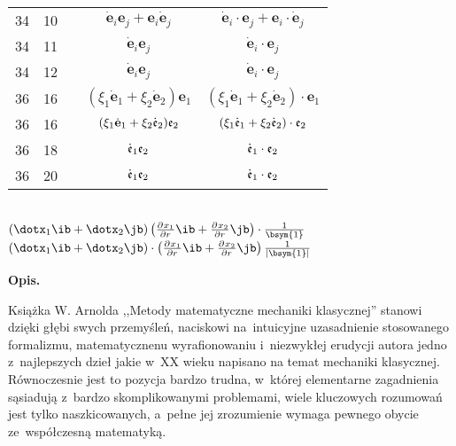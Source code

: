 \documentclass[a4paper,11pt]{article}
\begin{document}
\begin{center}
\begin{tabular}{|c|c|c|c|c|}
    34  & 10 & & $\dot{ \mathbf{ e } }_{ i } \mathbf{ e }_{ j }
                 + \mathbf{ e }_{ i } \dot{ \mathbf{ e } }_{ j }$
           & $\dot{ \mathbf{ e } }_{ i } \cdot \mathbf{ e }_{ j }
             + \mathbf{ e }_{ i } \cdot \dot{ \mathbf{ e } }_{ j }$ \\
    34  & 11 & & $\dot{ \mathbf{ e } }_{ i } \mathbf{ e }_{ j }$
           & $\dot{ \mathbf{ e } }_{ i } \cdot \mathbf{ e }_{ j }$ \\
    34  & 12 & & $\dot{ \mathbf{ e } }_{ i } \mathbf{ e }_{ j }$
           & $\dot{ \mathbf{ e } }_{ i } \cdot \mathbf{ e }_{ j }$ \\
    36  & 16 & & $( \xi_{ 1 } \dot{ \mathbf{ e } }_{ 1 } + \xi_{ 2 }
                 \dot{ \mathbf{ e } }_{ 2 }  ) \mathbf{ e }_{ 1 }$
           & $( \xi_{ 1 } \dot{ \mathbf{ e } }_{ 1 } + \xi_{ 2 }
             \dot{ \mathbf{ e } }_{ 2 }  ) \cdot \mathbf{ e }_{ 1 }$ \\
    36  & 16 & & $( \xi_{ 1 } \dot{ \mathbf{ e } }_{ 1 } + \xi_{ 2 }
                 \dot{ \mathfrak{ e } }_{ 2 }  ) \mathfrak{ e }_{ 2 }$
           & $( \xi_{ 1 } \dot{ \mathfrak{ e } }_{ 1 } + \xi_{ 2 }
             \dot{ \mathfrak{ e } }_{ 2 }  ) \cdot \mathfrak{ e }_{ 2 }$ \\
    36  & 18 & & $\dot{ \mathfrak{ e } }_{ 1 } \mathfrak{ e }_{ 2 }$
           & $\dot{ \mathfrak{ e } }_{ 1 } \cdot \mathfrak{ e }_{ 2 }$ \\
    36  & 20 & & $\dot{ \mathfrak{ e } }_{ 1 } \mathfrak{ e }_{ 2 }$
           & $\dot{ \mathfrak{ e } }_{ 1 } \cdot \mathfrak{ e }_{ 2 }$ \\
    \hline
  \end{tabular}
\end{center}
\noi
{} \\
\Jest
$( \dotx_{ 1 } \ib + \dotx_{ 2 } \jb ) \left( \pd{}{ x_{ 1 } }{ r }
  \ib + \pd{}{ x_{ 2 } }{ r } \jb \right)
\cdot \fr{ 1 }{ \bsym{ 1 } }$ \\
\Powin
$( \dotx_{ 1 } \ib + \dotx_{ 2 } \jb ) \cdot \left( \pd{}{ x_{ 1 } }{
    r } \ib + \pd{}{ x_{ 2 } }{ r } \jb \right)
\fr{ 1 }{ | \bsym{ 1 } | }$ \\

\vspace{\spaceTwo}



\begin{center}
  \Large{\textbf{Opis.}}
\end{center}

Książka W. Arnolda ,,Metody matematyczne mechaniki klasycznej''
stanowi dzięki głębi swych przemyśleń, naciskowi na~intuicyjne
uzasadnienie stosowanego formalizmu, matematycznenu wyrafionowaniu
i~niezwykłej erudycji autora jedno z~najlepszych dzieł jakie w~XX
wieku napisano na temat mechaniki klasycznej. Równoczesnie jest to
pozycja bardzo trudna, w~której elementarne zagadnienia sąsiadują
z~bardzo skomplikowanymi problemami, wiele kluczowych rozumowań jest
tylko naszkicowanych, a~pełne jej zrozumienie wymaga pewnego obycie
ze~współczesną matematyką.
\end{document}
